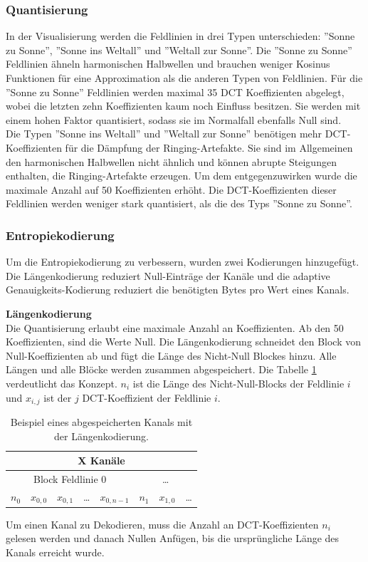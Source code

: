 \subsubsection{Quantisierung}
In der Visualisierung werden die Feldlinien in drei Typen unterschieden: ''Sonne zu Sonne'', ''Sonne ins Weltall'' und ''Weltall zur Sonne''.  Die ''Sonne zu Sonne'' Feldlinien ähneln harmonischen Halbwellen und brauchen weniger Kosinus Funktionen für eine Approximation als die anderen Typen von Feldlinien. Für die ''Sonne zu Sonne'' Feldlinien werden maximal 35 DCT Koeffizienten abgelegt, wobei die letzten zehn Koeffizienten kaum noch Einfluss besitzen. Sie werden mit einem hohen Faktor quantisiert, sodass sie im Normalfall ebenfalls Null sind.\\
Die Typen ''Sonne ins Weltall'' und ''Weltall zur Sonne'' benötigen mehr DCT-Koeffizienten für die Dämpfung der Ringing-Artefakte. Sie sind im Allgemeinen den harmonischen Halbwellen nicht ähnlich und können abrupte Steigungen enthalten, die Ringing-Artefakte erzeugen. Um dem entgegenzuwirken wurde die maximale Anzahl auf 50 Koeffizienten erhöht. Die DCT-Koeffizienten dieser Feldlinien werden weniger stark quantisiert, als die des Typs ''Sonne zu Sonne''.

\subsubsection{Entropiekodierung}\label{konzept:loesung1:kodierung}
Um die Entropiekodierung zu verbessern, wurden zwei Kodierungen hinzugefügt. Die Längenkodierung reduziert Null-Einträge der Kanäle und die adaptive Genauigkeits-Kodierung reduziert die benötigten Bytes pro Wert eines Kanals.

\textbf{Längenkodierung}\\
Die Quantisierung erlaubt eine maximale Anzahl an Koeffizienten. Ab den 50 Koeffizienten, sind die Werte Null. Die Längenkodierung schneidet den Block von Null-Koeffizienten ab und fügt die Länge des Nicht-Null Blockes hinzu. Alle Längen und alle Blöcke werden zusammen abgespeichert. Die Tabelle \ref{konzept:loesung1:entropie:laengenkodierung} verdeutlicht das Konzept. $n_i$ ist die Länge des Nicht-Null-Blocks der Feldlinie $i$ und $x_{i,j}$ ist der $j$ DCT-Koeffizient der Feldlinie $i$.

\begin{table}[!htbp]
	\center
	\begin{tabular}{||c|c|c|c|c||c|c|c}
		\hline
		\multicolumn{8}{|c|}{X Kanäle}\\\hline\hline
		 \multicolumn{5}{||c||}{Block Feldlinie 0} & \multicolumn{3}{c}{\ldots} \\\hline
		$n_0$ &$x_{0,0}$ &$x_{0,1}$ & \ldots & $x_{0,n-1}$ & $n_1$ & $x_{1,0}$ & \ldots\\\hline
	\end{tabular}
	\caption{Beispiel eines abgespeicherten Kanals mit der Längenkodierung.}
	\label{konzept:loesung1:entropie:laengenkodierung}
\end{table}
Um einen Kanal zu Dekodieren, muss die Anzahl an DCT-Koeffizienten $n_i$ gelesen werden und danach Nullen Anfügen, bis die ursprüngliche Länge des Kanals erreicht wurde.

